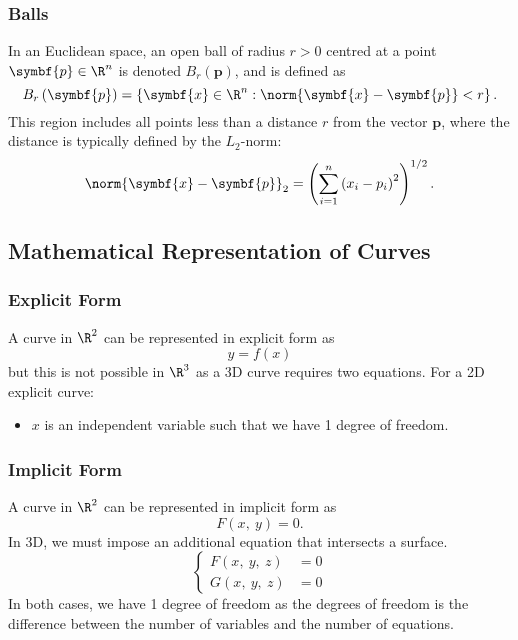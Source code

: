 \documentclass{article}
\begin{document}
\subsubsection{Balls}
In an Euclidean space, an open ball of radius \(r > 0\) centred at a
point \(\symbf{p} \in \R^n\) is denoted \(B_r\left( \symbf{p}
\right)\), and is defined as
\begin{equation*}
    B_r\left( \symbf{p} \right) = \left\{ \symbf{x} \in \R^n : \norm{\symbf{x} - \symbf{p}} < r \right\}.
\end{equation*}
This region includes all points less than a distance \(r\) from the vector \(\symbf{p}\),
where the distance is typically defined by the \(L_2\)-norm:
\begin{equation*}
    \norm{\symbf{x} - \symbf{p}}_2 = \left( \sum_{i=1}^n \left( x_i - p_i \right)^2 \right)^{1/2}.
\end{equation*}
\subsection{Mathematical Representation of Curves}
\subsubsection{Explicit Form}
A curve in \(\R^2\) can be represented in explicit form as
\begin{equation*}
    y = f\left( x \right)
\end{equation*}
but this is not possible in \(\R^3\) as a 3D curve requires two equations.
For a 2D explicit curve:
\begin{itemize}
    \item \(x\) is an independent variable such that we have 1 degree of freedom.
\end{itemize}
\subsubsection{Implicit Form}
A curve in \(\R^2\) can be represented in implicit form as
\begin{equation*}
    F\left( x,\: y \right) = 0.
\end{equation*}
In 3D, we must impose an additional equation that intersects a surface.
\begin{equation*}
    \left\{
    \begin{aligned}
        F\left( x,\: y,\: z \right) & = 0 \\
        G\left( x,\: y,\: z \right) & = 0
    \end{aligned}
    \right.
\end{equation*}
In both cases, we have 1 degree of freedom as the degrees of freedom is the
difference between the number of variables and the number of equations.
\end{document}
